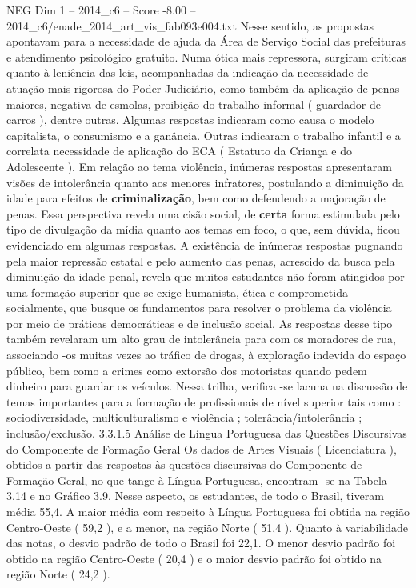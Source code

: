 \begin{textsample}{NEG Dim 1 – 2014\_c6 – Score -8.00 – 2014\_c6/enade\_2014\_art\_vis\_fab093e004.txt}
Nesse sentido, as propostas apontavam para a necessidade de ajuda da Área de Serviço Social das prefeituras e atendimento psicológico gratuito.
Numa ótica mais repressora, surgiram críticas quanto à leniência das leis, acompanhadas da indicação da necessidade de atuação mais rigorosa do Poder Judiciário, como também da aplicação de penas maiores, negativa de esmolas, proibição do trabalho informal ( guardador de carros ), dentre outras.
Algumas respostas indicaram como causa o modelo capitalista, o consumismo e a ganância.
Outras indicaram o trabalho infantil e a correlata necessidade de aplicação do ECA ( Estatuto da Criança e do Adolescente ).
Em relação ao tema violência, inúmeras respostas apresentaram visões de intolerância quanto aos menores infratores, postulando a diminuição da idade para efeitos de \textbf{criminalização}, bem como defendendo a majoração de penas.
Essa perspectiva revela uma cisão social, de \textbf{certa} forma estimulada pelo tipo de divulgação da mídia quanto aos temas em foco, o que, sem dúvida, ficou evidenciado em algumas respostas.
A existência de inúmeras respostas pugnando pela maior repressão estatal e pelo aumento das penas, acrescido da busca pela diminuição da idade penal, revela que muitos estudantes não foram atingidos por uma formação superior que se exige humanista, ética e comprometida socialmente, que busque os fundamentos para resolver o problema da violência por meio de práticas democráticas e de inclusão social.
As respostas desse tipo também revelaram um alto grau de intolerância para com os moradores de rua, associando -os muitas vezes ao tráfico de drogas, à exploração indevida do espaço público, bem como a crimes como extorsão dos motoristas quando pedem dinheiro para guardar os veículos.
Nessa trilha, verifica -se lacuna na discussão de temas importantes para a formação de profissionais de nível superior tais como : sociodiversidade, multiculturalismo e violência ; tolerância/intolerância ; inclusão/exclusão. 3.3.1.5 Análise de Língua Portuguesa das Questões Discursivas do Componente de Formação Geral Os dados de Artes Visuais ( Licenciatura ), obtidos a partir das respostas às questões discursivas do Componente de Formação Geral, no que tange à Língua Portuguesa, encontram -se na Tabela 3.14 e no Gráfico 3.9.
Nesse aspecto, os estudantes, de todo o Brasil, tiveram média 55,4.
A maior média com respeito à Língua Portuguesa foi obtida na região Centro-Oeste ( 59,2 ), e a menor, na região Norte ( 51,4 ).
Quanto à variabilidade das notas, o desvio padrão de todo o Brasil foi 22,1.
O menor desvio padrão foi obtido na região Centro-Oeste ( 20,4 ) e o maior desvio padrão foi obtido na região Norte ( 24,2 ).

\end{textsample}
